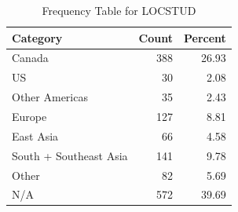 \begin{table}[!h]
\centering
\caption{\label{tab:tab:LOCSTUD}Frequency Table for LOCSTUD}
\centering
\begin{tabular}[t]{lrr}
\toprule
Category & Count & Percent\\
\midrule
Canada & 388 & 26.93\\
US & 30 & 2.08\\
Other Americas & 35 & 2.43\\
Europe & 127 & 8.81\\
East Asia & 66 & 4.58\\
\addlinespace
South + Southeast Asia & 141 & 9.78\\
Other & 82 & 5.69\\
N/A & 572 & 39.69\\
\bottomrule
\end{tabular}
\end{table}
